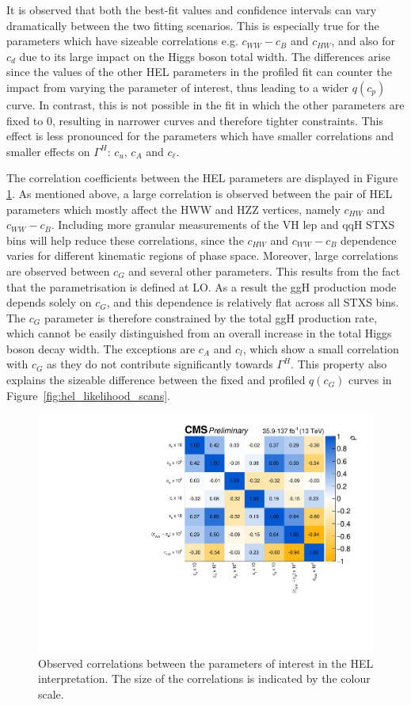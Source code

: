 It is observed that both the best-fit values and confidence intervals can vary dramatically between the two fitting scenarios. This is especially true for the parameters which have sizeable correlations e.g. $c_{WW}-c_B$ and $c_{HW}$, and also for $c_d$ due to its large impact on the Higgs boson total width. The differences arise since the values of the other HEL parameters in the profiled fit can counter the impact from varying the parameter of interest, thus leading to a wider $q(c_p)$ curve. In contrast, this is not possible in the fit in which the other parameters are fixed to 0, resulting in narrower curves and therefore tighter constraints. This effect is less pronounced for the parameters which have smaller correlations and smaller effects on $\Gamma^H$: $c_u$, $c_A$ and $c_\ell$. 

The correlation coefficients between the HEL parameters are displayed in Figure \ref{fig:hel_correlations}. As mentioned above, a large correlation is observed between the pair of HEL parameters which mostly affect the HWW and HZZ vertices, namely $c_{HW}$ and $c_{WW}-c_B$. Including more granular measurements of the VH lep and qqH STXS bins will help reduce these correlations, since the $c_{HW}$ and $c_{WW}-c_B$ dependence varies for different kinematic regions of phase space. Moreover, large correlations are observed between $c_G$ and several other parameters. This results from the fact that the parametrisation is defined at LO. As a result the ggH production mode depends solely on $c_G$, and this dependence is relatively flat across all STXS bins. The $c_G$ parameter is therefore constrained by the total ggH production rate, which cannot be easily distinguished from an overall increase in the total Higgs boson decay width. The exceptions are $c_A$ and $c_l$, which show a small correlation with $c_G$ as they do not contribute significantly towards $\Gamma^H$. This property also explains the sizeable difference between the fixed and profiled $q(c_G)$ curves in Figure~\ref{fig:hel_likelihood_scans}.

\begin{figure}[htbp]
  \centering
  \includegraphics[width=.8\textwidth]{Figures/eft/hel_correlations.pdf}
  \caption[Correlations in HEL parameters]
  {
    Observed correlations between the parameters of interest in the HEL interpretation. The size of the correlations is indicated by the colour scale.
  }
  \label{fig:hel_correlations}
\end{figure}

